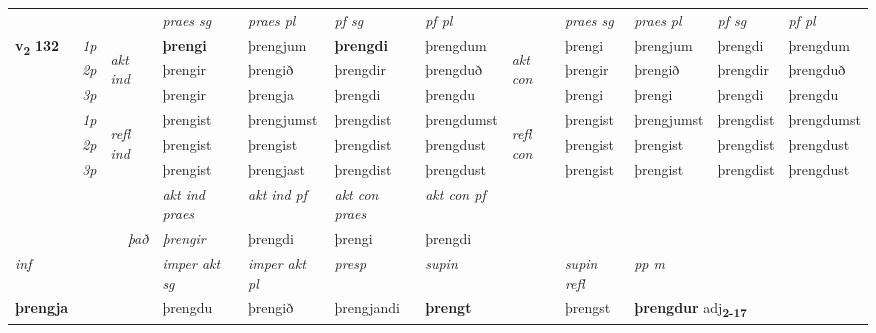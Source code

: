 \begin{longtable}[l]{X>{\footnotesize\itshape}llXXXXlXXXX}
 & &   & \textit{praes sg}  & \textit{praes pl}    & \textit{ pf sg} & \textit{pf pl} & & \textit{praes sg}  & \textit{praes pl}    & \textit{pf sg} & \textit{pf pl }  \\ \cmidrule{4-7} \cmidrule{9-12}
 \multirow{2}{*}{{{\textbf{v{\textsubscript{2}}} \Large{\textbf{132}}}}}  & 1p & \multirow{3}{*}{\begin{turn}{90}\textit{akt ind}\end{turn}} & \textbf{þrengi} & þrengjum & \textbf{þrengdi} & þrengdum & \multirow{3}{*}{\begin{turn}{90}\textit{akt con}\end{turn}} &þrengi & þrengjum & þrengdi & þrengdum\\*
 & 2p &  &  þrengir  & þrengið & þrengdir & þrengduð & & þrengir & þrengið & þrengdir & þrengduð \\*
 & 3p &  & þrengir & þrengja & þrengdi & þrengdu & & þrengi & þrengi& þrengdi & þrengdu \\*
\cmidrule{4-7} \cmidrule{9-12}
 & 1p & \multirow{3}{*}{\begin{turn}{90}\textit{refl ind}\end{turn}}  & þrengist & þrengjumst & þrengdist & þrengdumst & \multirow{3}{*}{\begin{turn}{90}\textit{refl con}\end{turn}}  &þrengist & þrengjumst & þrengdist & þrengdumst \\*
 & 2p &  & þrengist & þrengist & þrengdist & þrengdust & &þrengist & þrengist & þrengdist & þrengdust \\*
 & 3p  & & þrengist & þrengjast & þrengdist & þrengdust & & þrengist & þrengist& þrengdist & þrengdust \\*
\cmidrule{4-7} \cmidrule{9-12}

   && &  \textit{akt ind praes} & \textit{akt ind pf} & \textit{akt con praes} & \textit{akt con pf} \\*
\multicolumn{3}{r}{\textit{það}} & þrengir & þrengdi & þrengi & þrengdi \\*

\cmidrule{4-7}
   {\textit{inf}} & &  & \textit{imper akt sg} & \textit{imper akt pl}   & \textit{presp} & \textit{supin} && \textit{supin refl} & \textit{pp m} \\*
  {\textbf{þrengja}} & && þrengdu  & þrengið   & þrengjandi &  \textbf{þrengt} && þrengst & \multicolumn{2}{l}{\textbf{þrengdur} adj\textbf{\textsubscript{2-17}}} \\*


\end{longtable}
